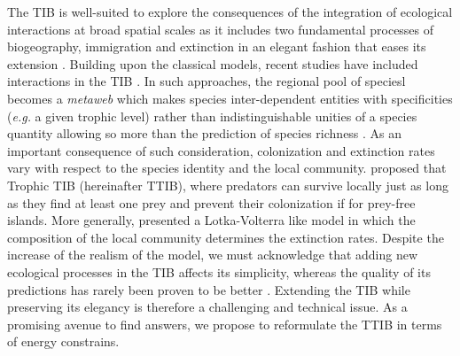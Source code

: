 The TIB is well-suited to explore the consequences of the integration of
ecological interactions at broad spatial scales as it includes two
fundamental processes of biogeography, immigration and extinction in an
elegant fashion that eases its extension \citep{Losos2010, Warren2015}.
Building upon the classical models, recent studies have included
interactions in the TIB \citep{Gravel2011, Cazelles2015a}. In such
approaches, the regional pool of speciesl becomes a \emph{metaweb} which
makes species inter-dependent entities with specificities (\emph{e.g.} a
given trophic level) rather than indistinguishable unities of a species
quantity allowing so more than the prediction of species richness
\citep[\emph{e.g} the occurrence probabilities of species from different
trophic levels][]{Gravel2011}. As an important consequence of such
consideration, colonization and extinction rates vary with respect to
the species identity and the local community. \citet{Gravel2011}
proposed that Trophic TIB (hereinafter TTIB), where predators can
survive locally just as long as they find at least one prey and prevent
their colonization if for prey-free islands. More generally,
\citet{Cazelles2015} presented a Lotka-Volterra like model in which the
composition of the local community determines the extinction rates.
Despite the increase of the realism of the model, we must acknowledge
that adding new ecological processes in the TIB affects its simplicity,
whereas the quality of its predictions has rarely been proven to be
better \citep[see][]{Cirtwill2015}. Extending the TIB while preserving
its elegancy is therefore a challenging and technical issue. As a
promising avenue to find answers, we propose to reformulate the TTIB in
terms of energy constrains.


